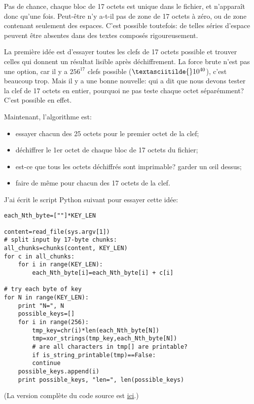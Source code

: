 Pas de chance, chaque bloc de 17 octets est unique dans le fichier, et n'apparaît
donc qu'une fois.
Peut-être n'y a-t-il pas de zone de 17 octets à zéro, ou de zone contenant seulement
des espaces.
C'est possible toutefois: de telles séries d'espace peuvent être absentes dans des
textes composés rigoureusement.

La première idée est d'essayer toutes les clefs de 17 octets possible et trouver
celles qui donnent un résultat lisible après déchiffrement.
La force brute n'est pas une option, car il y a $256^{17}$ clefs possible ($\textasciitilde{}10^{40}$),
c'est beaucoup trop.
Mais il y a une bonne nouvelle: qui a dit que nous devons tester la clef de 17 octets
en entier, pourquoi ne pas teste chaque octet séparémment?
C'est possible en effet.

Maintenant, l'algorithme est:

\begin{itemize}
\item essayer chacun des 25 octets pour le premier octet de la clef;
\item déchiffrer le 1er octet de chaque bloc de 17 octets du fichier;
\item est-ce que tous les octets déchiffrés sont imprimable? garder un \oe{}il dessus;
\item faire de même pour chacun des 17 octets de la clef.
\end{itemize}

J'ai écrit le script Python suivant pour essayer cette idée:

\begin{lstlisting}[caption=Python script,style=custompy]
each_Nth_byte=[""]*KEY_LEN

content=read_file(sys.argv[1])
# split input by 17-byte chunks:
all_chunks=chunks(content, KEY_LEN)
for c in all_chunks:
    for i in range(KEY_LEN):
        each_Nth_byte[i]=each_Nth_byte[i] + c[i]

# try each byte of key
for N in range(KEY_LEN):
    print "N=", N
    possible_keys=[]
    for i in range(256):
        tmp_key=chr(i)*len(each_Nth_byte[N])
        tmp=xor_strings(tmp_key,each_Nth_byte[N])
        # are all characters in tmp[] are printable?
        if is_string_printable(tmp)==False:
	    continue
	possible_keys.append(i)
    print possible_keys, "len=", len(possible_keys)
\end{lstlisting}

(La version complète du code source est
 \href{\RepoURL/ff/XOR/mask_2/files/decrypt2.py}{ici}.)

